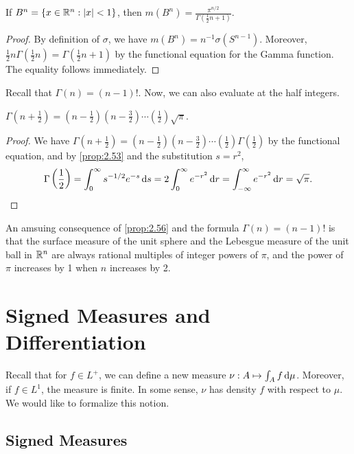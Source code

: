 \documentclass[12pt]{article} %
\begin{document}
\begin{corollary}
    If $B^n = \{x \in \mathbb{R}^n : |x| < 1\}$, then $m(B^n) = \frac{\pi^{n/2}}{\Gamma(\frac{1}{2}n + 1)}$.
\end{corollary}

\begin{proof}
    By definition of $\sigma$, we have $m(B^n) = n^{-1} \sigma(S^{n-1})$. Moreover, $\frac{1}{2}n \Gamma(\frac{1}{2}n) = \Gamma(\frac{1}{2}n + 1)$ by the functional equation for the Gamma function. The equality follows immediately.
\end{proof}

Recall that $\Gamma(n) = (n-1)!$. Now, we can also evaluate at the half integers.

\begin{proposition}\label{prop:2.56}
    $\Gamma(n + \frac{1}{2}) = (n - \frac{1}{2})(n - \frac{3}{2}) \cdots (\frac{1}{2})\sqrt{\pi}$.
\end{proposition}

\begin{proof}
    We have $\Gamma(n + \frac{1}{2}) = (n - \frac{1}{2})(n - \frac{3}{2}) \cdots (\frac{1}{2})\Gamma(\frac{1}{2})$ by the functional equation, and by \cref{prop:2.53} and the substitution $s = r^2$, \[\Gamma\left(\frac{1}{2}\right) = \int_0^\infty s^{-1/2}e^{-s} \, \mathrm{d} s = 2 \int_0^\infty e^{-r^2} \, \mathrm{d} r = \int_{-\infty}^{\infty} e^{-r^2} \, \mathrm{d} r = \sqrt{\pi}.\]
\end{proof}

\noindent An amsuing consequence of \cref{prop:2.56} and the formula $\Gamma(n) = (n-1)!$ is that the surface measure of the unit sphere and the Lebesgue measure of the unit ball in $\mathbb{R}^n$ are always rational multiples of integer powers of $\pi$, and the power of $\pi$ increases by 1 when $n$ increases by 2.


\section{Signed Measures and Differentiation}

Recall that for $f \in L^+$, we can define a new measure $\nu : A \mapsto \int_A f \, \mathrm{d} \mu$. Moreover, if $f \in L^1$, the measure is finite. In some sense, $\nu$ has density $f$ with respect to $\mu$. We would like to formalize this notion.

\subsection{Signed Measures}
\end{document}
